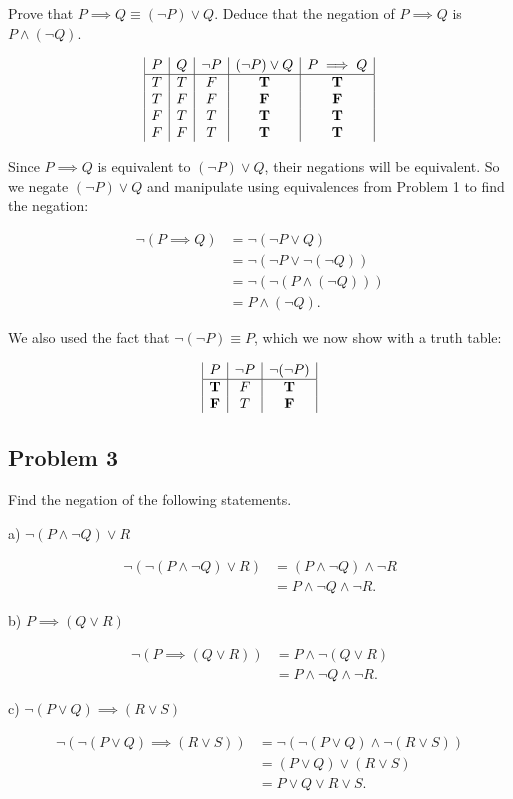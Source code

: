 \documentclass[11pt]{article}
\begin{document}
Prove that $P \implies Q \equiv (\lnot P) \lor Q$. Deduce that the negation of
$P \implies Q$ is $P \land (\lnot Q)$.

$$
\begin{array}{|c|c|c|c|c|}
P & Q & \lnot P & (\lnot P) \lor Q & P \implies Q \\
\hline
T & T & F & \bf T & \bf T \\
T & F & F & \bf F & \bf F \\
F & T & T & \bf T & \bf T \\
F & F & T & \bf T & \bf T \\
\end{array}
$$

Since $P \implies Q$ is equivalent to $(\lnot P) \lor Q$, their negations will be
equivalent. So we negate  $(\lnot P) \lor Q$ and manipulate using equivalences from
Problem 1 to find the negation:

$$
\begin{array}{rl}
\lnot (P \implies Q) &= \lnot (\lnot P \lor Q) \\
&= \lnot(\lnot P \lor \lnot (\lnot Q)) \\
&= \lnot (\lnot (P \land (\lnot Q))) \\
&= P \land (\lnot Q).
\end{array}
$$

We also used the fact that $\lnot (\lnot P) \equiv P$, which we now show with a
truth table:

$$
\begin{array}{|c|c|c|}
P & \lnot P & \lnot (\lnot P) \\
\hline
\bf T & F & \bf T \\
\bf F & T & \bf F \\
\end{array}
$$

\subsection*{Problem 3}

Find the negation of the following statements.

a) $\lnot(P \land \lnot Q) \lor R$

$$
\begin{array}{rl}
\lnot (\lnot(P \land \lnot Q) \lor R) &= (P \land \lnot Q) \land \lnot R \\
&= P \land \lnot Q \land \lnot R.
\end{array}
$$

b) $P \implies (Q \lor R)$

$$
\begin{array}{rl}
\lnot (P \implies (Q \lor R)) &= P \land \lnot (Q \lor R) \\
&= P \land \lnot Q \land \lnot R.
\end{array}
$$

c) $\lnot (P \lor Q) \implies (R \lor S)$

$$
\begin{array}{rl}
\lnot (\lnot (P \lor Q) \implies (R \lor S))
&= \lnot (\lnot (P \lor Q) \land \lnot (R \lor S)) \\
&= (P \lor Q) \lor (R \lor S) \\
&= P \lor Q \lor R \lor S.
\end{array}
$$
\end{document}
